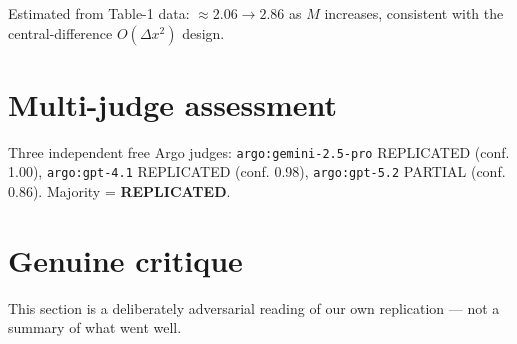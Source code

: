 \documentclass[11pt]{article}
\begin{document}
Estimated from Table-1 data: $\approx 2.06 \to 2.86$ as $M$ increases, consistent with the
central-difference $O(\Delta x^2)$ design.

\section{Multi-judge assessment}

Three independent free Argo judges: \texttt{argo:gemini-2.5-pro} REPLICATED (conf. 1.00),
\texttt{argo:gpt-4.1} REPLICATED (conf. 0.98), \texttt{argo:gpt-5.2} PARTIAL (conf. 0.86).
Majority = \textbf{REPLICATED}.

\section{Genuine critique}

This section is a deliberately adversarial reading of our own replication --- not a summary of
what went well.
\end{document}
